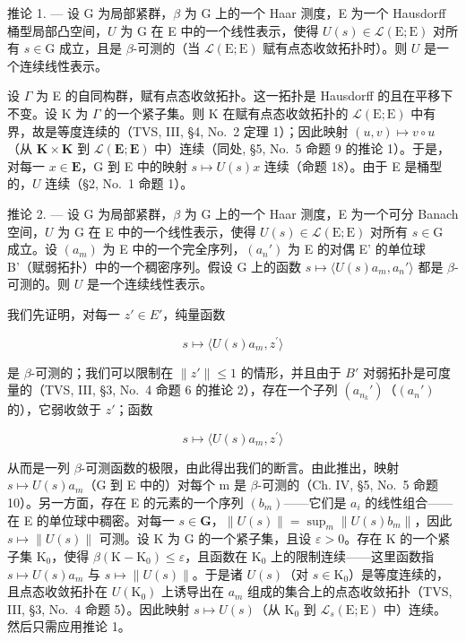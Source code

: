 推论 1. --- 设 G 为局部紧群，\(\beta\) 为 G 上的一个 Haar 测度，E 为一个 Hausdorff 桶型局部凸空间，\(U\) 为 G 在 E 中的一个线性表示，使得 \(U(s) \in \mathcal{L}(\mathrm{E};\mathrm{E})\) 对所有 \(s \in \mathrm{G}\) 成立，且是 \(\beta\)-可测的（当 \(\mathcal{L}(\mathrm{E};\mathrm{E})\) 赋有点态收敛拓扑时）。则 \(U\) 是一个连续线性表示。

设 \(\Gamma\) 为 E 的自同构群，赋有点态收敛拓扑。这一拓扑是 Hausdorff 的且在平移下不变。设 K 为 \(\Gamma\) 的一个紧子集。则 K 在赋有点态收敛拓扑的 \(\mathcal{L}(\mathrm{E};\mathrm{E})\) 中有界，故是等度连续的（TVS, III, §4, No.~2 定理 1）；因此映射 \((u,v)\mapsto v\circ u\)（从 \(\mathbf{K}\times \mathbf{K}\) 到 \(\mathcal{L}(\mathbf{E};\mathbf{E})\) 中）连续（同处, §5, No.~5 命题 9 的推论 1）。于是，对每一 \(x\in \mathbf{E}\)，G 到 E 中的映射 \(s\mapsto U(s)x\) 连续（命题 18）。由于 E 是桶型的，\(U\) 连续（§2, No.~1 命题 1）。

推论 2. --- 设 G 为局部紧群，\(\beta\) 为 G 上的一个 Haar 测度，E 为一个可分 Banach 空间，\(U\) 为 G 在 E 中的一个线性表示，使得 \(U(s) \in \mathcal{L}(\mathrm{E};\mathrm{E})\) 对所有 \(s \in \mathrm{G}\) 成立。设 \((a_m)\) 为 E 中的一个完全序列，\((a_n')\) 为 E 的对偶 E' 的单位球 B'（赋弱拓扑）中的一个稠密序列。假设 G 上的函数 \(s \mapsto \langle U(s)a_m, a_n' \rangle\) 都是 \(\beta\)-可测的。则 \(U\) 是一个连续线性表示。

我们先证明，对每一 \(z' \in E'\)，纯量函数

\[
s \mapsto \langle U (s) a _ {m}, z ^ {\prime} \rangle
\]

是 \(\beta\)-可测的；我们可以限制在 \(\|z'\| \leqslant 1\) 的情形，并且由于 \(B'\) 对弱拓扑是可度量的（TVS, III, §3, No.~4 命题 6 的推论 2），存在一个子列 \((a_{n_k}')\)（\((a_n')\) 的），它弱收敛于 \(z'\)；函数

\[
s \mapsto \langle U (s) a _ {m}, z ^ {\prime} \rangle
\]

从而是一列 \(\beta\)-可测函数的极限，由此得出我们的断言。由此推出，映射 \(s \mapsto U(s)a_{m}\)（G 到 E 中的）对每个 m 是 \(\beta\)-可测的（Ch. IV, §5, No.~5 命题 10）。另一方面，存在 E 的元素的一个序列 \((b_{m})\)——它们是 \(a_{i}\) 的线性组合——在 E 的单位球中稠密。对每一 \(s \in \mathbf{G}\)，\(\|U(s)\| = \sup_{m} \|U(s)b_{m}\|\)，因此 \(s \mapsto \|U(s)\|\) 可测。设 K 为 G 的一个紧子集，且设 \(\varepsilon > 0\)。存在 K 的一个紧子集 \(\mathrm{K}_{0}\)，使得 \(\beta(\mathrm{K} - \mathrm{K}_{0}) \leqslant \varepsilon\)，且函数在 \(\mathrm{K}_{0}\) 上的限制连续——这里函数指 \(s \mapsto U(s)a_{m}\) 与 \(s \mapsto \|U(s)\|\)。于是诸 \(U(s)\)（对 \(s \in \mathrm{K}_{0}\)）是等度连续的，且点态收敛拓扑在 \(U(\mathrm{K}_{0})\) 上诱导出在 \(a_{m}\) 组成的集合上的点态收敛拓扑（TVS, III, §3, No.~4 命题 5）。因此映射 \(s \mapsto U(s)\)（从 \(\mathrm{K}_{0}\) 到 \(\mathcal{L}_{s}(\mathrm{E};\mathrm{E})\) 中）连续。然后只需应用推论 1。

